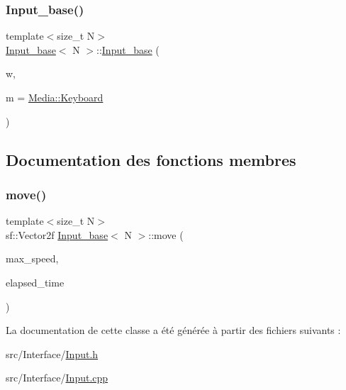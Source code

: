 \subsubsection{\texorpdfstring{Input\+\_\+base()}{Input\_base()}}
{\footnotesize\ttfamily template$<$size\+\_\+t N$>$ \\
\hyperlink{class_input__base}{Input\+\_\+base}$<$ N $>$\+::\hyperlink{class_input__base}{Input\+\_\+base} (\begin{DoxyParamCaption}\item[{const sf\+::\+Render\+Window \&}]{w,  }\item[{\hyperlink{class_input__base_a455585e7933485981b3d7bfcad3a47c6}{Media}}]{m = {\ttfamily \hyperlink{class_input__base_a455585e7933485981b3d7bfcad3a47c6a6ce4d85a628a88bbdb3ac24a8e5a9c2e}{Media\+::\+Keyboard}} }\end{DoxyParamCaption})\hspace{0.3cm}{\ttfamily [explicit]}}



\subsection{Documentation des fonctions membres}
\mbox{\label{class_input__base_a157b2510537e9f9ee1c29726456541e4}} 
\subsubsection{\texorpdfstring{move()}{move()}}
{\footnotesize\ttfamily template$<$size\+\_\+t N$>$ \\
sf\+::\+Vector2f \hyperlink{class_input__base}{Input\+\_\+base}$<$ N $>$\+::move (\begin{DoxyParamCaption}\item[{float}]{max\+\_\+speed,  }\item[{const sf\+::\+Time \&}]{elapsed\+\_\+time }\end{DoxyParamCaption})}



La documentation de cette classe a été générée à partir des fichiers suivants \+:\begin{DoxyCompactItemize}
\item 
src/\+Interface/\hyperlink{_input_8h}{Input.\+h}\item 
src/\+Interface/\hyperlink{_input_8cpp}{Input.\+cpp}\end{DoxyCompactItemize}
